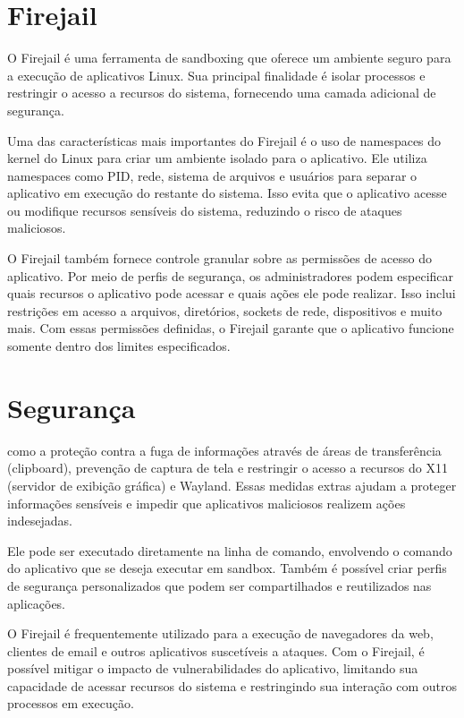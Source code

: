 \section{Firejail}

O Firejail é uma ferramenta de sandboxing que oferece um ambiente seguro para a execução de aplicativos Linux. Sua principal finalidade é isolar processos e restringir o acesso a recursos do sistema, fornecendo uma camada adicional de segurança.

Uma das características mais importantes do Firejail é o uso de namespaces do kernel do Linux para criar um ambiente isolado para o aplicativo. Ele utiliza namespaces como PID, rede, sistema de arquivos e usuários para separar o aplicativo em execução do restante do sistema. Isso evita que o aplicativo acesse ou modifique recursos sensíveis do sistema, reduzindo o risco de ataques maliciosos.

O Firejail também fornece controle granular sobre as permissões de acesso do aplicativo. Por meio de perfis de segurança, os administradores podem especificar quais recursos o aplicativo pode acessar e quais ações ele pode realizar. Isso inclui restrições em acesso a arquivos, diretórios, sockets de rede, dispositivos e muito mais. Com essas permissões definidas, o Firejail garante que o aplicativo funcione somente dentro dos limites especificados.

\section{Segurança}

 como a proteção contra a fuga de informações através de áreas de transferência (clipboard), prevenção de captura de tela e restringir o acesso a recursos do X11 (servidor de exibição gráfica) e Wayland. Essas medidas extras ajudam a proteger informações sensíveis e impedir que aplicativos maliciosos realizem ações indesejadas.
 

Ele pode ser executado diretamente na linha de comando, envolvendo o comando do aplicativo que se deseja executar em sandbox. Também é possível criar perfis de segurança personalizados que podem ser compartilhados e reutilizados nas aplicações.

O Firejail é frequentemente utilizado para a execução de navegadores da web, clientes de email e outros aplicativos suscetíveis a ataques. Com o Firejail, é possível mitigar o impacto de vulnerabilidades do aplicativo, limitando sua capacidade de acessar recursos do sistema e restringindo sua interação com outros processos em execução.